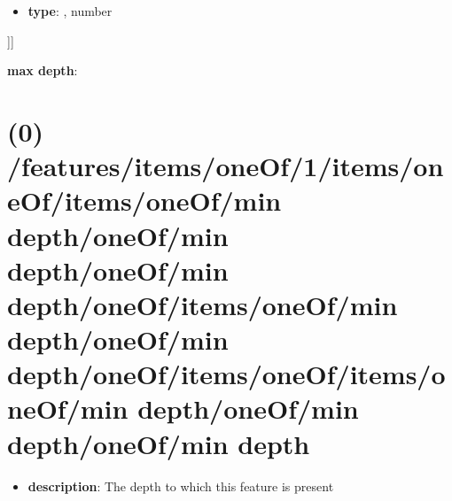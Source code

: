 \begin{itemize}[leftmargin=5em]\item {\bf type}: , number\end{itemize}]]\item {\bf max depth}: \section{(0) /features/items/oneOf/1/items/oneOf/items/oneOf/min depth/oneOf/min depth/oneOf/min depth/oneOf/items/oneOf/min depth/oneOf/min depth/oneOf/items/oneOf/items/oneOf/min depth/oneOf/min depth/oneOf/min depth}
\begin{itemize}[leftmargin=0em]\item {\bf description}: The depth to which this feature is present
\end{itemize}
